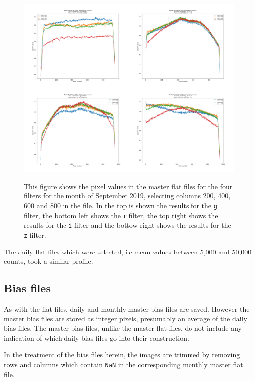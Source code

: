 \begin{figure}[!htbp]
\begin{center}
\includegraphics[scale=0.25]{images/Cmcold.png} \\
\end{center}   
\caption{This figure shows the pixel values in the master flat files for the
four filters for the month of September 2019, selecting columns 200, 400, 600
and 800 in the file.
In the top is shown the results for the \texttt{g} filter, the bottom left shows the \texttt{r} filter,
the top right shows the results for the \texttt{i} filter and the bottow right
shows the results for the \texttt{z} filter. }
\protect\label{fig:mbycol}
\end{figure}
\clearpage

The daily flat files which were selected, i.e.mean values between 5,000 and
50,000 counts, took a similar profile.

\subsection{Bias files}
\protect\label{section:biasfiles}

As with the flat files, daily and monthly master bias files are saved. However
the master bias files are stored as integer pixels, presumably an average of the
daily bias files. The master bias files, unlike the master flat files, do not
include any indication of which daily bias files go into their construction.

In the treatment of the bias files herein, the images are trimmed by removing
rows and columns which contain \texttt{NaN} in the corresponding monthly master
flat file.

